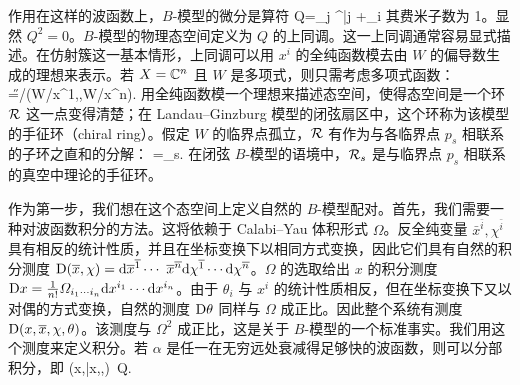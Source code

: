 作用在这样的波函数上，$B$-模型的微分是算符
\be\label{bdiff} Q=\sum_j \chi^{\bar j} +\sum_i   \ee  其费米子数为 1。显然 $Q^2=0$。$B$-模型的物理态空间定义为 $Q$ 的上同调。这一上同调通常容易显式描述。在仿射簇这一基本情形，上同调可以用 $x^i$ 的全纯函数模去由 $W$ 的偏导数生成的理想来表示。若 $X={\mathbb C}^n$ 且 $W$ 是多项式，则只需考虑多项式函数：
\be\label{hilbdef} \H=\C[x_1,\cdots,x_n]/(\partial W/\partial x^1,\cdots,\partial W/\partial x^n). \ee
用全纯函数模一个理想来描述态空间，使得态空间是一个环 ${\mathcal R}$ 这一点变得清楚；在 Landau–Ginzburg 模型的闭弦扇区中，这个环称为该模型的手征环（chiral ring）。假定 $W$ 的临界点孤立，${\mathcal R}$ 有作为与各临界点 $p_s$ 相联系的子环之直和的分解：
\be\label{bco} \RR=\oplus \RR_s.\ee
在闭弦 $B$-模型的语境中，${\mathcal R}_s$ 是与临界点 $p_s$ 相联系的真空中理论的手征环。

作为第一步，我们想在这个态空间上定义自然的 $B$-模型配对。首先，我们需要一种对波函数积分的方法。这将依赖于 Calabi–Yau 体积形式 $\varOmega$。反全纯变量 $\bar x^{\bar i}, \chi^{\bar i}$ 具有相反的统计性质，并且在坐标变换下以相同方式变换，因此它们具有自然的积分测度 $\dD(\bar x,\chi)=\d \bar x^{\bar 1}\cdots \ \bar x^{\bar n}\d\chi^{\bar 1}\cdots\d\chi^{\bar n}$。$\varOmega$ 的选取给出 $x$ 的积分测度 ${\mathrm D} x=\frac{1}{n!} \varOmega_{i_1\cdots i_n}{\mathrm d} x^{i_1}\cdots {\mathrm d} x^{i_n}$。由于 $\theta_i$ 与 $x^i$ 的统计性质相反，但在坐标变换下又以对偶的方式变换，自然的测度 ${\mathrm D}\theta$ 同样与 $\varOmega$ 成正比。因此整个系统有测度 ${\mathrm D}(x,\overline x, \chi,\theta)$。该测度与 $\varOmega^2$ 成正比，这是关于 $B$-模型的一个标准事实。我们用这个测度来定义积分。若 $\alpha$ 是任一在无穷远处衰减得足够快的波函数，则可以分部积分，即
\be\label{intparts} \int \dD(x,\bar x,\chi,\theta)\, Q.\ee
{}

